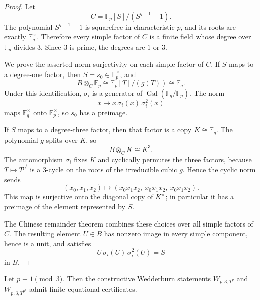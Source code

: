 \begin{proof}
  Let
  \[
    C=\mathbb F_p[S]/(S^{q-1}-1).
  \]
  The polynomial \(S^{q-1}-1\) is squarefree in characteristic \(p\), and its roots are exactly \(\mathbb F_q^\times\).  Therefore every simple factor of \(C\) is a finite field whose degree over \(\mathbb F_p\) divides \(3\).  Since \(3\) is prime, the degrees are \(1\) or \(3\).

  We prove the asserted norm-surjectivity on each simple factor of \(C\).  If \(S\) maps to a degree-one factor, then \(S=s_0\in \mathbb F_p^\times\), and
  \[
    B\otimes_C \mathbb F_p \cong \mathbb F_p[T]/(g(T))\cong \mathbb F_q.
  \]
  Under this identification, \(\sigma_i\) is a generator of \(\operatorname{Gal}(\mathbb F_q/\mathbb F_p)\).  The norm
  \[
    x\longmapsto x\,\sigma_i(x)\,\sigma_i^2(x)
  \]
  maps \(\mathbb F_q^\times\) onto \(\mathbb F_p^\times\), so \(s_0\) has a preimage.

  If \(S\) maps to a degree-three factor, then that factor is a copy \(K\cong \mathbb F_q\).  The polynomial \(g\) splits over \(K\), so
  \[
    B\otimes_C K\cong K^3.
  \]
  The automorphism \(\sigma_i\) fixes \(K\) and cyclically permutes the three factors, because \(T\mapsto T^{p^i}\) is a 3-cycle on the roots of the irreducible cubic \(g\).  Hence the cyclic norm sends
  \[
    (x_0,x_1,x_2)\longmapsto (x_0x_1x_2,\ x_0x_1x_2,\ x_0x_1x_2).
  \]
  This map is surjective onto the diagonal copy of \(K^\times\); in particular it has a preimage of the element represented by \(S\).

  The Chinese remainder theorem combines these choices over all simple factors of \(C\).  The resulting element \(U\in B\) has nonzero image in every simple component, hence is a unit, and satisfies
  \[
    U\,\sigma_i(U)\,\sigma_i^2(U)=S
  \]
  in \(B\).
\end{proof}

\begin{proposition}\label{prop:bad-class-wedderburn}
  Let \(p\equiv 1 \pmod 3\).  Then the constructive Wedderburn statements \(W_{p,3,T^p}\) and \(W_{p,3,T^{p^2}}\) admit finite equational certificates.
\end{proposition}

